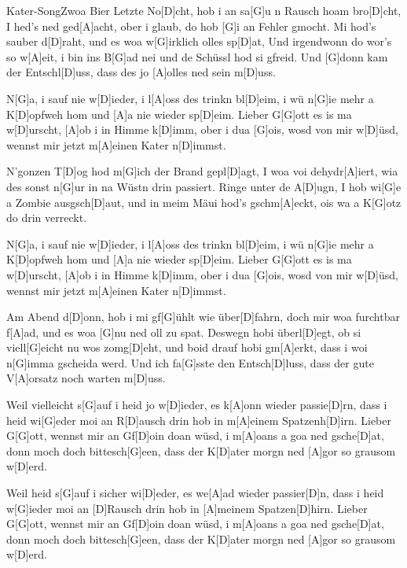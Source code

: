 \documentclass[../main.tex]{subfiles}
\begin{document}
\begin{song}[2]{Kater-Song}{Zwoa Bier}{}
Letzte No[D]cht, hob i an sa[G]u n Rausch hoam bro[D]cht,
I hed's ned ged[A]acht, ober i glaub, do hob [G]i an Fehler gmocht.
Mi hod's sauber d[D]raht, und es woa w[G]irklich olles sp[D]at,
Und irgendwonn do wor's so w[A]eit, i bin ins B[G]ad nei und de Schüssl hod si gfreid.
Und [G]donn kam der Entschl[D]uss, dass des jo [A]olles ned sein m[D]uss.

N[G]a, i sauf nie w[D]ieder, i l[A]oss des trinkn bl[D]eim,
i wü n[G]ie mehr a K[D]opfweh hom und [A]a nie wieder sp[D]eim.
Lieber G[G]ott es is ma w[D]urscht, [A]ob i in Himme k[D]imm,
ober i dua [G]ois, wosd von mir w[D]{ü}sd, wennst mir jetzt m[A]einen Kater n[D]immst.

N'gonzen T[D]og hod m[G]ich der Brand gepl[D]agt,
I woa voi dehydr[A]iert, wia des sonst n[G]ur in na Wüstn drin passiert.
Ringe unter de A[D]ugn, I hob wi[G]e a Zombie ausgsch[D]aut,
und in meim Mäui hod's gschm[A]eckt, ois wa a K[G]otz do drin verreckt.

N[G]a, i sauf nie w[D]ieder, i l[A]oss des trinkn bl[D]eim,
i wü n[G]ie mehr a K[D]opfweh hom und [A]a nie wieder sp[D]eim.
Lieber G[G]ott es is ma w[D]urscht, [A]ob i in Himme k[D]imm,
ober i dua [G]ois, wosd von mir w[D]{ü}sd, wennst mir jetzt m[A]einen Kater n[D]immst.

Am Abend d[D]onn, hob i mi gf[G]{ü}hlt wie über[D]fahrn,
doch mir woa furchtbar f[A]ad, und es woa [G]nu ned oll zu spat.
Deswegn hobi überl[D]egt, ob si viell[G]eicht nu wos zomg[D]eht,
und boid drauf hobi gm[A]erkt, dass i woi n[G]imma gscheida werd.
Und ich fa[G]sste den Entsch[D]luss, dass der gute V[A]orsatz noch warten m[D]uss.

Weil vielleicht s[G]auf i heid jo w[D]ieder, es k[A]onn wieder passie[D]rn,
dass i heid wi[G]eder moi an R[D]ausch drin hob in m[A]einem Spatzenh[D]irn.
Lieber G[G]ott, wennst mir an Gf[D]oin doan wüsd, i m[A]oans a goa ned gsche[D]at,
donn moch doch bittesch[G]een, dass der K[D]ater morgn ned [A]gor so grausom w[D]erd.

Weil heid s[G]auf i sicher wi[D]eder, es we[A]ad wieder passier[D]n,
dass i heid w[G]ieder moi an [D]Rausch drin hob in [A]meinem Spatzen[D]hirn.
Lieber G[G]ott, wennst mir an Gf[D]oin doan wüsd, i m[A]oans a goa ned gsche[D]at,
donn moch doch bittesch[G]een, dass der K[D]ater morgn ned [A]gor so grausom w[D]erd.

\end{song}
\end{document}
